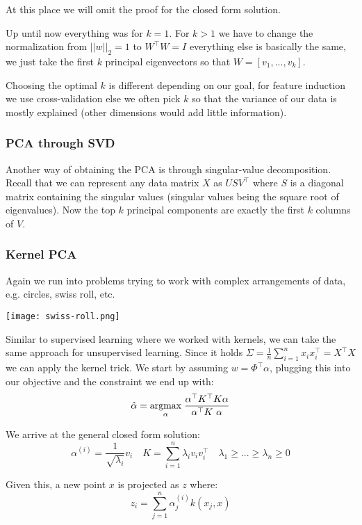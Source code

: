 At this place we will omit the proof for the closed form solution. \medskip

Up until now everything was for $k = 1$. For $k > 1$ we have to change the normalization from $||w||_2 = 1$ to $W^\top W = I$ everything else is basically the same, we just take the first $k$ principal eigenvectors so that $W = [v_1, ..., v_k]$.

Choosing the optimal $k$ is different depending on our goal, for feature induction we use cross-validation else we often pick $k$ so that the variance of our data is mostly explained (other dimensions would add little information).

\subsubsection{PCA through SVD}

Another way of obtaining the PCA is through singular-value decomposition. Recall that we can represent any data matrix $X$ as $U S V^\top$ where $S$ is a diagonal matrix containing the singular values (singular values being the square root of eigenvalues). Now the top $k$ principal components are exactly the first $k$ columns of $V$.

\subsubsection{Kernel PCA}

Again we run into problems trying to work with complex arrangements of data, e.g. circles, swiss roll, etc.

\begin{center}
	\texttt{[image: swiss-roll.png]}
\end{center}

Similar to supervised learning where we worked with kernels, we can take the same approach for unsupervised learning. Since it holds $\Sigma = \frac{1}{n} \sum_{i=1}^n x_i x_i^\top = X^\top X$ we can apply the kernel trick. We start by assuming $w = \Phi^\top \alpha$, plugging this into our objective and the constraint we end up with:
$$\hat{\alpha} = \argmax{\alpha} \; \frac{\alpha^\top K^\top K \alpha}{\alpha^\top K \alpha}$$

We arrive at the general closed form solution:
$$\alpha^{(i)} = \frac{1}{\sqrt{\lambda_i}}v_i \quad K = \sum_{i = 1}^n \lambda_i v_i v_i^\top \quad \lambda_1 \geq ... \geq \lambda_n \geq 0$$

Given this, a new point $x$ is projected as $z$ where:
$$z_i = \sum_{j=1}^n \alpha_j^{(i)} k(x_j, x)$$

